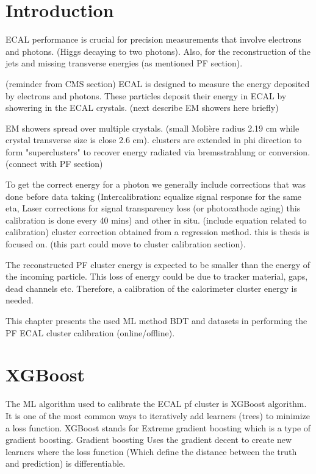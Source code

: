 
\section{Introduction}

ECAL performance is crucial for precision measurements that involve electrons and photons. 
(Higgs decaying to two photons). Also, for the reconstruction of the jets and missing transverse energies (as mentioned PF section).

(reminder from CMS section) ECAL is designed to measure the energy deposited by electrons and photons. These particles deposit their energy in ECAL by showering in the ECAL crystals. (next describe EM showers here briefly)

EM showers spread over multiple crystals. (small Molière radius 2.19 cm while crystal transverse size is close 2.6 cm). clusters are extended in phi direction to form "superclusters" to recover energy radiated via bremsstrahlung or conversion. (connect with PF section)

To get the correct energy for a photon we generally include corrections that was done before data taking (Intercalibration: equalize signal response for the same eta, Laser corrections for signal transparency loss (or photocathode aging) this calibration is done every 40 mins) and other in situ. (include equation related to calibration) cluster correction obtained from a regression method. this is thesis is focused on. (this part could move to cluster calibration section).

The reconstructed PF cluster energy is expected to be smaller than the energy of the incoming particle. This loss of energy could be due to tracker material, gaps, dead channels etc. Therefore, a calibration of the calorimeter cluster energy is needed.

This chapter presents the used ML method BDT and datasets in performing the PF ECAL cluster calibration (online/offline).  


\section{XGBoost} %

The ML algorithm used to calibrate the ECAL pf cluster is XGBoost algorithm. It is one of the most common ways to iteratively add learners (trees) to minimize a loss function. XGBoost stands for Extreme gradient boosting which is a type of gradient boosting. Gradient boosting Uses the gradient decent to create new learners where the loss function (Which define the distance between the truth and prediction) is differentiable. %

